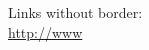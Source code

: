 \documentclass{article}
\begin{document}
\setlength\parindent{0pt}

Links without border: \\
\url{http://www}
\end{document}
